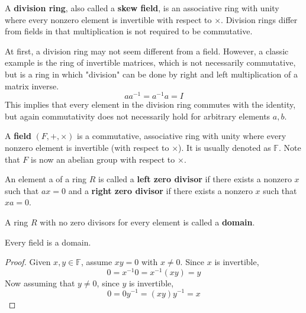   \begin{example}
    A \textbf{division ring}, also called a \textbf{skew field}, is an associative ring with unity where every nonzero element is invertible with respect to $\times$. Division rings differ from fields in that multiplication is not required to be commutative. 
  \end{example}

  At first, a division ring may not seem different from a field. However, a classic example is the ring of invertible matrices, which is not necessarily commutative, but is a ring in which "division" can be done by right and left multiplication of a matrix inverse. 
  \begin{equation}
    a a^{-1} = a^{-1} a = I
  \end{equation}
  This implies that every element in the division ring commutes with the identity, but again commutativity does not necessarily hold for arbitrary elements $a, b$. 

  \begin{definition}
    A \textbf{field} $(F, +, \times)$ is a commutative, associative ring with unity where every nonzero element is invertible (with respect to $\times$). It is usually denoted as $\mathbb{F}$. Note that $F$ is now an abelian group with respect to $\times$. 
  \end{definition}

  \begin{definition}
    An element a of a ring $R$ is called a \textbf{left zero divisor} if there exists a nonzero $x$ such that $a x = 0$ and a \textbf{right zero divisor} if there exists a nonzero $x$ such that $x a = 0$. 
  \end{definition}

  \begin{definition}
    A ring $R$ with no zero divisors for every element is called a \textbf{domain}. 
  \end{definition}

  \begin{proposition}
    Every field is a domain. 
  \end{proposition}
  \begin{proof}
    Given $x, y \in \mathbb{F}$, assume $x y = 0$ with $x \neq 0$. Since $x$ is invertible,
    \begin{equation}
      0 = x^{-1} 0 = x^{-1} (x y) = y
    \end{equation}
    Now assuming that $y \neq 0$, since $y$ is invertible, 
    \begin{equation}
      0 = 0 y^{-1} = (x y) y^{-1} = x
    \end{equation}
  \end{proof}

